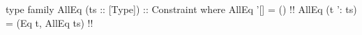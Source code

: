 \begin{code}
type family AllEq (ts :: [Type]) :: Constraint where
  AllEq '[]       = ()  !!
  AllEq (t ': ts) = (Eq t, AllEq ts)  !!
\end{code}
